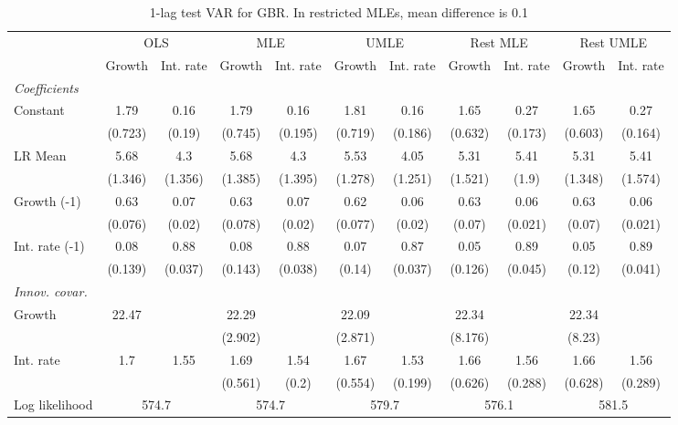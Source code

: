 \begin{table}[htbp] 
	\centering
	\begin{tabular}{@{\extracolsep{4pt}}lcccccccccc@{}}		\hline\hline
		 		 & \multicolumn{2}{c}{OLS} &\multicolumn{2}{c}{MLE} &\multicolumn{2}{c}{UMLE} &\multicolumn{2}{c}{Rest MLE} &\multicolumn{2}{c}{Rest UMLE} \\ 
 		 & Growth 	 & Int. rate 	 & Growth 	 & Int. rate 	 & Growth 	 & Int. rate 	 & Growth 	 & Int. rate 	 & Growth 	 & Int. rate\\\cline{2-3}\cline{4-5}\cline{6-7}\cline{8-9}\cline{10-11}
\rule{0pt}{4ex} 
 \emph{Coefficients} 	  		 & 		 & 		 & 		 & 		 & 		 & 		 & 		 & 		 & 		 &\\ 
\quad Constant 	 & 1.79 	 & 0.16 	 & 1.79 	 & 0.16 	 & 1.81 	 & 0.16 	 & 1.65 	 & 0.27 	 & 1.65 	 & 0.27	 \\ 
 		 & (0.723) 	 & (0.19) 	 & (0.745) 	 & (0.195) 	 & (0.719) 	 & (0.186) 	 & (0.632) 	 & (0.173) 	 & (0.603) 	 & (0.164) 	 \\ 
\quad LR Mean 	 & 5.68 	 & 4.3 	 & 5.68 	 & 4.3 	 & 5.53 	 & 4.05 	 & 5.31 	 & 5.41 	 & 5.31 	 & 5.41	 \\ 
 		 & (1.346) 	 & (1.356) 	 & (1.385) 	 & (1.395) 	 & (1.278) 	 & (1.251) 	 & (1.521) 	 & (1.9) 	 & (1.348) 	 & (1.574) 	 \\ 
\quad Growth (-1) 	 &0.63 	 & 0.07 	 & 0.63 	 & 0.07 	 & 0.62 	 & 0.06 	 & 0.63 	 & 0.06 	 & 0.63 	 & 0.06	 \\ 
 		 & (0.076) 	 & (0.02) 	 & (0.078) 	 & (0.02) 	 & (0.077) 	 & (0.02) 	 & (0.07) 	 & (0.021) 	 & (0.07) 	 & (0.021) 	 \\ 
\quad Int. rate (-1) 	 &0.08 	 & 0.88 	 & 0.08 	 & 0.88 	 & 0.07 	 & 0.87 	 & 0.05 	 & 0.89 	 & 0.05 	 & 0.89	 \\ 
 		 & (0.139) 	 & (0.037) 	 & (0.143) 	 & (0.038) 	 & (0.14) 	 & (0.037) 	 & (0.126) 	 & (0.045) 	 & (0.12) 	 & (0.041) 	 \\ 
\rule{0pt}{4ex} \emph{Innov. covar.}  	 & 	 & 	 & 	 & 	 & 	 & 	 & 	 & 	 & 	 &\\ 
\quad Growth 	 &22.47 	 &  	 & 22.29 	 &  	 & 22.09 	 &  	 & 22.34 	 &  	 & 22.34 	 & 	 \\ 
 		 &  	 &  	 & (2.902) 	 &  	 & (2.871) 	 &  	 & (8.176) 	 &  	 & (8.23) 	 &  	 \\ 
\quad Int. rate 	 &1.7 	 & 1.55 	 & 1.69 	 & 1.54 	 & 1.67 	 & 1.53 	 & 1.66 	 & 1.56 	 & 1.66 	 & 1.56	 \\ 
 		 &  	 &  	 & (0.561) 	 & (0.2) 	 & (0.554) 	 & (0.199) 	 & (0.626) 	 & (0.288) 	 & (0.628) 	 & (0.289) 	 \\ 
 \hline \rule{0pt}{4ex} 
  Log likelihood 	 &\multicolumn{2}{c}{574.7} 	 & \multicolumn{2}{c}{574.7} 	 & \multicolumn{2}{c}{579.7} 	 & \multicolumn{2}{c}{576.1} 	 & \multicolumn{2}{c}{581.5}\\ 

 \hline 	\end{tabular}		\caption{1-lag test VAR for GBR. In restricted MLEs, mean difference is 0.1}
		\label{tab:GBR1lag}

\end{table}